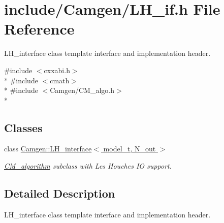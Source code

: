 \hypertarget{a00658}{\section{include/\-Camgen/\-L\-H\-\_\-if.h File Reference}
\label{a00658}
}


L\-H\-\_\-interface class template interface and implementation header.  


{\ttfamily \#include $<$cxxabi.\-h$>$}\\*
{\ttfamily \#include $<$cmath$>$}\\*
{\ttfamily \#include $<$Camgen/\-C\-M\-\_\-algo.\-h$>$}\\*
\subsection*{Classes}
\begin{DoxyCompactItemize}
\item 
class \hyperlink{a00322}{Camgen\-::\-L\-H\-\_\-interface$<$ model\-\_\-t, N\-\_\-out $>$}
\begin{DoxyCompactList}\small\item\em \hyperlink{a00070}{C\-M\-\_\-algorithm} subclass with Les Houches I\-O support. \end{DoxyCompactList}\end{DoxyCompactItemize}


\subsection{Detailed Description}
L\-H\-\_\-interface class template interface and implementation header. 